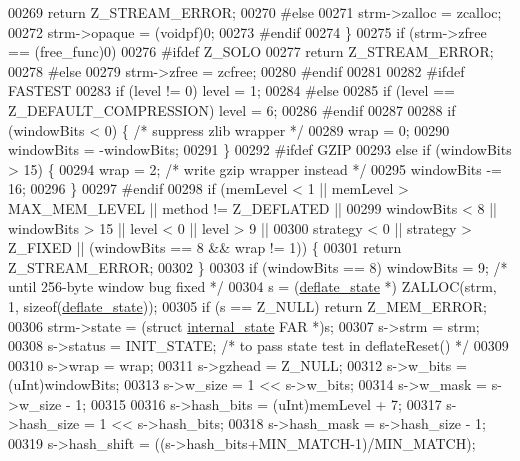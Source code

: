 \begin{DoxyCode}
00269         \textcolor{keywordflow}{return} Z\_STREAM\_ERROR;
00270 \textcolor{preprocessor}{#else}
00271         strm->zalloc = zcalloc;
00272         strm->opaque = (voidpf)0;
00273 \textcolor{preprocessor}{#endif}
00274     \}
00275     \textcolor{keywordflow}{if} (strm->zfree == (free\_func)0)
00276 #ifdef Z\_SOLO
00277         \textcolor{keywordflow}{return} Z\_STREAM\_ERROR;
00278 \textcolor{preprocessor}{#else}
00279         strm->zfree = zcfree;
00280 \textcolor{preprocessor}{#endif}
00281 
00282 \textcolor{preprocessor}{#ifdef FASTEST}
00283     \textcolor{keywordflow}{if} (level != 0) level = 1;
00284 \textcolor{preprocessor}{#else}
00285     \textcolor{keywordflow}{if} (level == Z\_DEFAULT\_COMPRESSION) level = 6;
00286 \textcolor{preprocessor}{#endif}
00287 
00288     \textcolor{keywordflow}{if} (windowBits < 0) \{ \textcolor{comment}{/* suppress zlib wrapper */}
00289         wrap = 0;
00290         windowBits = -windowBits;
00291     \}
00292 \textcolor{preprocessor}{#ifdef GZIP}
00293     \textcolor{keywordflow}{else} \textcolor{keywordflow}{if} (windowBits > 15) \{
00294         wrap = 2;       \textcolor{comment}{/* write gzip wrapper instead */}
00295         windowBits -= 16;
00296     \}
00297 \textcolor{preprocessor}{#endif}
00298     \textcolor{keywordflow}{if} (memLevel < 1 || memLevel > MAX\_MEM\_LEVEL || method != Z\_DEFLATED ||
00299         windowBits < 8 || windowBits > 15 || level < 0 || level > 9 ||
00300         strategy < 0 || strategy > Z\_FIXED || (windowBits == 8 && wrap != 1)) \{
00301         \textcolor{keywordflow}{return} Z\_STREAM\_ERROR;
00302     \}
00303     \textcolor{keywordflow}{if} (windowBits == 8) windowBits = 9;  \textcolor{comment}{/* until 256-byte window bug fixed */}
00304     s = (\hyperlink{structinternal__state}{deflate\_state} *) ZALLOC(strm, 1, \textcolor{keyword}{sizeof}(\hyperlink{structinternal__state}{deflate\_state}));
00305     \textcolor{keywordflow}{if} (s == Z\_NULL) \textcolor{keywordflow}{return} Z\_MEM\_ERROR;
00306     strm->state = (\textcolor{keyword}{struct }\hyperlink{structinternal__state}{internal\_state} FAR *)s;
00307     s->strm = strm;
00308     s->status = INIT\_STATE;     \textcolor{comment}{/* to pass state test in deflateReset() */}
00309 
00310     s->wrap = wrap;
00311     s->gzhead = Z\_NULL;
00312     s->w\_bits = (uInt)windowBits;
00313     s->w\_size = 1 << s->w\_bits;
00314     s->w\_mask = s->w\_size - 1;
00315 
00316     s->hash\_bits = (uInt)memLevel + 7;
00317     s->hash\_size = 1 << s->hash\_bits;
00318     s->hash\_mask = s->hash\_size - 1;
00319     s->hash\_shift =  ((s->hash\_bits+MIN\_MATCH-1)/MIN\_MATCH);

\end{DoxyCode}
